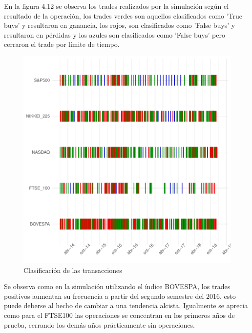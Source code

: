 \documentclass[a4paper,12pt]{Latex/Classes/PhDthesisPSnPDF}
\begin{document}
En la figura 4.12 se observa los trades realizados por la simulación según el resultado de la operación, los trades verdes son aquellos clasificados como 'True buys' y resultaron en ganancia, los rojos, son clasificados como 'False buys' y resultaron en pérdidas y los azules son clasificados como 'False buys' pero cerraron el trade por límite de tiempo.

\begin{figure}[H]
\centering
\includegraphics{main-030}
\caption{Clasificación de las transacciones}
\end{figure}

Se observa como en la simulación utilizando el índice BOVESPA, los trades positivos aumentan su frecuencia a partir del segundo semestre del 2016, esto puede deberse al hecho de cambiar a una tendencia alcista. Igualmente se aprecia como para el FTSE100 las operaciones se concentran en los primeros años de prueba, cerrando los demás años prácticamente sin operaciones.
\end{document}
